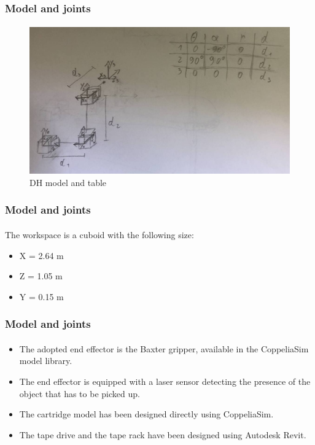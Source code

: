\documentclass[12pt]{beamer}
\begin{document}
\begin{frame}
\frametitle{Model and joints}
\framesubtitle{}
\begin{figure}
    \centering
    \includegraphics[height=.71\textheight, trim={0 0 0 0}, clip]{img/photo_2023-07-02_11-51-53.jpg}
    \caption{DH model and table}
    \label{fig:DH}
\end{figure}
\end{frame}

\begin{frame}
\frametitle{Model and joints}
\framesubtitle{}
The workspace is a cuboid with the following size:
\begin{itemize}
    \item X = 2.64 m
    \item Z = 1.05 m
    \item Y = 0.15 m
\end{itemize}
\end{frame}

\begin{frame}
\frametitle{Model and joints}
\framesubtitle{}
\begin{itemize}
\item The adopted end effector is the Baxter gripper, available in the CoppeliaSim model library.
\item The end effector is equipped with a laser sensor detecting the presence of the object that has to be picked up.
\item The cartridge model has been designed directly using CoppeliaSim.
\item The tape drive and the tape rack have been designed using Autodesk Revit.
\end{itemize}
\end{frame}
\end{document}
